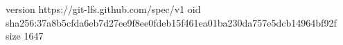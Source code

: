 version https://git-lfs.github.com/spec/v1
oid sha256:37a8b5cfda6eb7d27ee9f8ee0fdeb15f461ea01ba230da757e5dcb14964bf92f
size 1647
